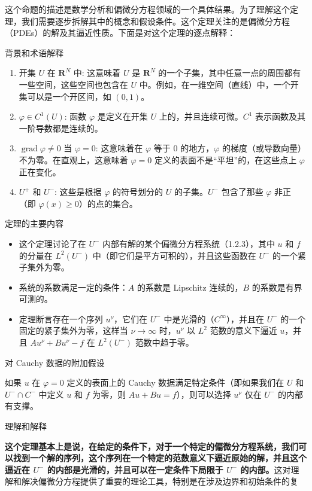 \documentclass[lang=cn,zihao=-4,a4paper,fontset=none]{beautybook}
\begin{document}
\begin{remark}
这个命题的描述是数学分析和偏微分方程领域的一个具体结果。为了理解这个定理，我们需要逐步拆解其中的概念和假设条件。这个定理关注的是偏微分方程（PDEs）的解及其逼近性质。下面是对这个定理的逐点解释：

背景和术语解释
\begin{enumerate}
  \item 开集 $U$ 在 $\mathbf{R}^N$ 中: 这意味着 $U$ 是 $\mathbf{R}^N$ 的一个子集，其中任意一点的周围都有一些空间，这些空间也包含在 $U$ 中。例如，在一维空间（直线）中，一个开集可以是一个开区间，如 $(0,1)$。

\item $\varphi \in C^1(U)$: 函数 $\varphi$ 是定义在开集 $U$ 上的，并且连续可微。$C^1$ 表示函数及其一阶导数都是连续的。

\item $\operatorname{grad} \varphi \neq 0$ 当 $\varphi=0$: 这意味着在 $\varphi$ 等于 0 的地方，$\varphi$ 的梯度（或导数向量）不为零。在直观上，这意味着 $\varphi=0$ 定义的表面不是“平坦”的，在这些点上 $\varphi$ 正在变化。

\item $U^+$ 和 $U^-$: 这些是根据 $\varphi$ 的符号划分的 $U$ 的子集。$U^-$ 包含了那些 $\varphi$ 非正（即 $\varphi(x) \geq 0$）的点的集合。
\end{enumerate}

定理的主要内容
\begin{itemize}
  \item  这个定理讨论了在 $U^-$ 内部有解的某个偏微分方程系统（1.2.3），其中 $u$ 和 $f$ 的分量在 $L^2(U^-)$ 中（即它们是平方可积的），并且这些函数在 $U^-$ 的一个紧子集外为零。

\item 系统的系数满足一定的条件：$A$ 的系数是 Lipschitz 连续的，$B$ 的系数是有界可测的。

\item 定理断言存在一个序列 $u^\nu$，它们在 $U^-$ 中是光滑的（$C^\infty$），并且在 $U^-$ 的一个固定的紧子集外为零，这样当 $\nu \rightarrow \infty$ 时，$u^\nu$ 以 $L^2$ 范数的意义下逼近 $u$，并且 $A u^\nu + B u^\nu - f$ 在 $L^2(U^-)$ 范数中趋于零。
\end{itemize}
对 Cauchy 数据的附加假设

如果 $u$ 在 $\varphi=0$ 定义的表面上的 Cauchy 数据满足特定条件（即如果我们在 $U$ 和 $U^- \cap C^-$ 中定义 $u$ 和 $f$ 为零，则 $A u + B u = f$），则可以选择 $u^\nu$ 仅在 $U^-$ 的内部有支撑。

理解和解释

\textbf{这个定理基本上是说，在给定的条件下，对于一个特定的偏微分方程系统，我们可以找到一个解的序列，这个序列在一个特定的范数意义下逼近原始的解，并且这个逼近在 $U^-$ 的内部是光滑的，并且可以在一定条件下局限于 $U^-$ 的内部。}这对理解和解决偏微分方程提供了重要的理论工具，特别是在涉及边界和初始条件的复
\end{remark}
\end{document}
